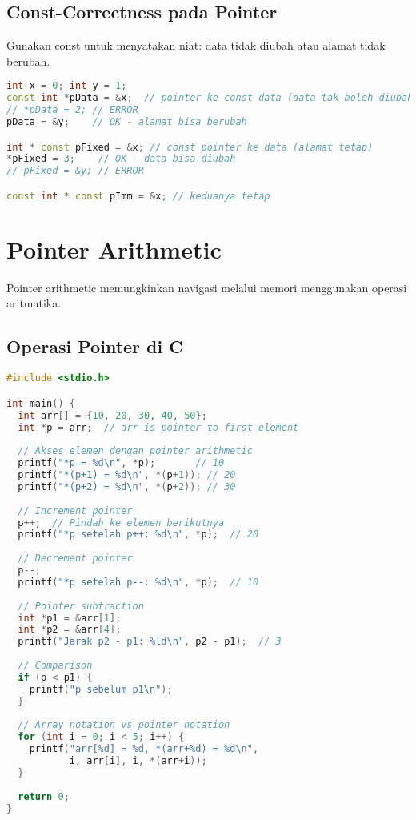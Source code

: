 \documentclass[../main.tex]{subfiles}
\begin{document}
\subsection{Const-Correctness pada Pointer}
Gunakan const untuk menyatakan niat: data tidak diubah atau alamat tidak berubah.
\begin{lstlisting}[language=C++]
int x = 0; int y = 1;
const int *pData = &x;  // pointer ke const data (data tak boleh diubah lewat pData)
// *pData = 2; // ERROR
pData = &y;    // OK - alamat bisa berubah

int * const pFixed = &x; // const pointer ke data (alamat tetap)
*pFixed = 3;    // OK - data bisa diubah
// pFixed = &y; // ERROR

const int * const pImm = &x; // keduanya tetap
\end{lstlisting}

\section{Pointer Arithmetic}

Pointer arithmetic memungkinkan navigasi melalui memori menggunakan operasi aritmatika.

\subsection{Operasi Pointer di C}

\begin{lstlisting}[language=C, caption={Pointer arithmetic di C}]
#include <stdio.h>

int main() {
  int arr[] = {10, 20, 30, 40, 50};
  int *p = arr;  // arr is pointer to first element
  
  // Akses elemen dengan pointer arithmetic
  printf("*p = %d\n", *p);       // 10
  printf("*(p+1) = %d\n", *(p+1)); // 20
  printf("*(p+2) = %d\n", *(p+2)); // 30
  
  // Increment pointer
  p++;  // Pindah ke elemen berikutnya
  printf("*p setelah p++: %d\n", *p);  // 20
  
  // Decrement pointer
  p--;
  printf("*p setelah p--: %d\n", *p);  // 10
  
  // Pointer subtraction
  int *p1 = &arr[1];
  int *p2 = &arr[4];
  printf("Jarak p2 - p1: %ld\n", p2 - p1);  // 3
  
  // Comparison
  if (p < p1) {
    printf("p sebelum p1\n");
  }
  
  // Array notation vs pointer notation
  for (int i = 0; i < 5; i++) {
    printf("arr[%d] = %d, *(arr+%d) = %d\n", 
           i, arr[i], i, *(arr+i));
  }
  
  return 0;
}
\end{lstlisting}
\end{document}
